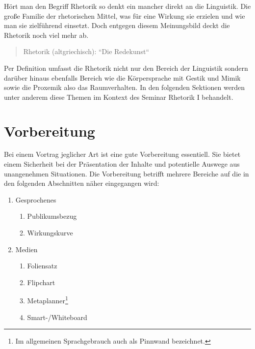 \documentclass[../main.tex]{subfiles}
\begin{document}
    
    Hört man den Begriff Rhetorik so denkt ein mancher direkt an die Linguistik. Die große Familie der rhetorischen Mittel, was für eine Wirkung sie erzielen und wie man sie zielführend einsetzt. Doch entgegen diesem Meinungsbild deckt die Rhetorik noch viel mehr ab.
    \begin{quote}
        Rhetorik (altgriechisch): ``Die Redekunst``
    \end{quote}
    Per Definition umfasst die Rhetorik nicht nur den Bereich der Linguistik sondern darüber hinaus ebenfalls Bereich wie die Körpersprache mit Gestik und Mimik sowie die Proxemik also das Raumverhalten. In den folgenden Sektionen werden unter anderem diese Themen im Kontext des Seminar Rhetorik I behandelt.
    
    \clearpage
    
    \section{Vorbereitung}
        Bei einem Vortrag jeglicher Art ist eine gute Vorbereitung essentiell. Sie bietet einem Sicherheit bei der Präsentation der Inhalte und potentielle Auswege aus unangenehmen Situationen. Die Vorbereitung betrifft mehrere Bereiche auf die in den folgenden Abschnitten näher eingegangen wird:
        \begin{enumerate}
            \item Gesprochenes
            \begin{enumerate}
                \item Publikumsbezug
                \item Wirkungskurve
            \end{enumerate}
            \item Medien
            \begin{enumerate}
                \item Foliensatz
                \item Flipchart
                \item Metaplanner\footnote{Im allgemeinen Sprachgebrauch auch als Pinnwand bezeichnet.}
                \item Smart-/Whiteboard
            \end{enumerate}
        \end{enumerate}
        
\end{document}
